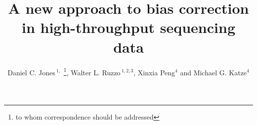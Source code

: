 \documentclass{bioinfo}
\begin{document}

\title{A new approach to bias correction in high-throughput sequencing data}
\author[Jones \textit{et~al}]
{Daniel C. Jones\,$^{1,}$
\hspace{-0.5em}\footnote{to whom correspondence should be addressed}\hspace{0.5em},
Walter L. Ruzzo\,$^{1,2,3}$,
Xinxia Peng$^{4}$
and
Michael G. Katze$^{4}$
}


\address{
$^{1}$Department of Computer Science and Engineering, University of
Washington, Seattle, WA 98195-2350, USA\\
$^{2}$Department of Genome Sciences, University of Washington, Seattle, Wa
98195-5065, USA\\
$^{3}$Fred Hutchinson Cancer Research Center, Seattle, WA 98109, USA\\
$^{4}$Department of Microbiology, University of Washington, Seattle, WA
98195-7242, USA}


\maketitle
\end{document}

